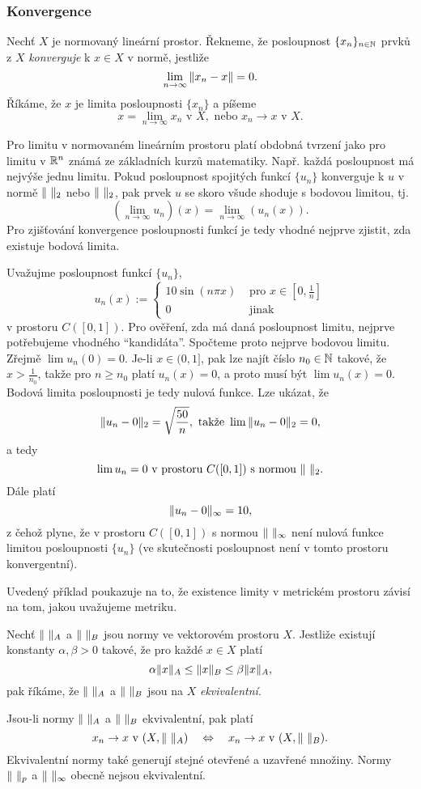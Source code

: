 \subsubsection{Konvergence}
% 
\begin{df}
Nechť $X$ je normovaný lineární prostor. Řekneme, že posloupnost $\{x_n\}_{n\in\mathbb N}$ prvků z $X$ \emph{konverguje} k $x\in X$ v normě, jestliže
\[ \lim_{n\rightarrow\infty} \|x_n-x\| = 0. \]
Říkáme, že $x$ je limita posloupnosti $\{x_n\}$ a píšeme
\[ x=\lim_{n\to\infty} x_n \mbox{ v }X, \mbox{ nebo }x_n\to x \mbox{ v }X. \]
\end{df}
% 
Pro limitu v normovaném lineárním prostoru platí obdobná tvrzení jako pro limitu v $\mathbb R^n$ známá ze základních kurzů matematiky.
Např. každá posloupnost má nejvýše jednu limitu.
Pokud posloupnost spojitých funkcí $\{u_n\}$ konverguje k $u$ v normě $\|\ \|_2$ nebo $\|\ \|_2$, pak prvek $u$ se skoro všude shoduje s bodovou limitou, tj.
\[ (\lim_{n\to\infty} u_n)(x) = \lim_{n\to\infty} (u_n(x)). \]
Pro zjišťování konvergence posloupnosti funkcí je tedy vhodné nejprve zjistit, zda existuje bodová limita.

\begin{ex}
Uvažujme posloupnost funkcí $\{u_n\}$,
\[ u_n(x) := \begin{cases}10\sin(n\pi x) & \mbox{ pro }x\in[0,\frac1n]\\0 & \mbox{ jinak}\end{cases} \]
v prostoru $C([0,1])$.
Pro ověření, zda má daná posloupnost limitu, nejprve potřebujeme vhodného ``kandidáta''.
Spočteme proto nejprve bodovou limitu.
Zřejmě $\lim u_n(0)=0$.
Je-li $x\in(0,1]$, pak lze najít číslo $n_0\in\mathbb N$ takové, že $x>\frac1{n_0}$, takže pro $n\ge n_0$ platí $u_n(x)=0$, a proto musí být $\lim u_n(x) = 0$.
Bodová limita posloupnosti je tedy nulová funkce.
Lze ukázat, že
\[ \|u_n-0\|_2 = \sqrt{\frac{50}n}, \mbox{ takže }\lim \|u_n-0\|_2=0, \]
a tedy
\[ \lim u_n = 0 \mbox{ v prostoru }C([0,1]) \mbox{ s normou }\|\ \|_2. \]
Dále platí
\[ \|u_n-0\|_\infty = 10, \]
z čehož plyne, že v prostoru $C([0,1])$ s normou $\|\ \|_\infty$ není nulová funkce limitou posloupnosti $\{u_n\}$ (ve skutečnosti posloupnost není v tomto prostoru konvergentní).
\end{ex}
% 
Uvedený příklad poukazuje na to, že existence limity v metrickém prostoru závisí na tom, jakou uvažujeme metriku.
\begin{df}
Nechť $\|\ \|_A$ a $\|\ \|_B$ jsou normy ve vektorovém prostoru $X$.
Jestliže existují konstanty $\alpha,\beta>0$ takové, že pro každé $x\in X$ platí
\[ \alpha\|x\|_A \le \|x\|_B \le \beta\|x\|_A, \]
pak říkáme, že $\|\ \|_A$ a $\|\ \|_B$ jsou na $X$ \emph{ekvivalentní}.
\end{df}
% 
Jsou-li normy $\|\ \|_A$ a $\|\ \|_B$ ekvivalentní, pak platí
\[ x_n\rightarrow x \mbox{ v }(X,\|\ \|_A) \quad \Leftrightarrow \quad x_n\rightarrow x \mbox{ v }(X,\|\ \|_B). \]
Ekvivalentní normy také generují stejné otevřené a uzavřené množiny.
Normy $\|\ \|_p$ a $\|\ \|_\infty$ obecně nejsou ekvivalentní.








